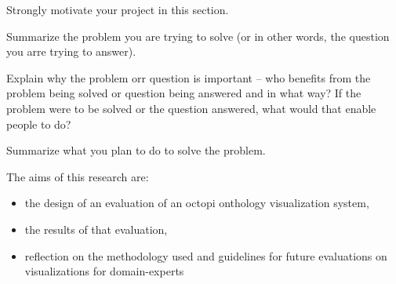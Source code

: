 
Strongly motivate your project in this section.

Summarize the problem you are trying to solve (or in other words, the question
you arre trying to answer).

Explain why the problem orr question is important -- who benefits from the
problem being solved or question being answered and in what way? If the
problem were to be solved or the question answered, what would that enable
people to do?

Summarize what you plan to do to solve the problem.

The aims of this research are:
\begin{itemize}
  \item the design of an evaluation of an octopi onthology visualization
    system,
  \item the results of that evaluation,
  \item reflection on the methodology used and guidelines for future
    evaluations on visualizations for domain-experts
\end{itemize}


